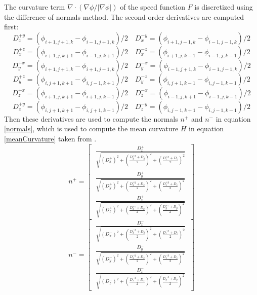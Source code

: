 The curvature term \(\nabla \cdot (\nabla \phi / |\nabla \phi|)\) of the speed function \(F\) is discretized using the difference of normals method. The second order derivatives are computed first:
\begin{equation*}
D_x^{+y} = (\phi_{i+1,j+1,k} - \phi_{i-1,j+1,k})/2 \quad D_x^{-y} = (\phi_{i+1,j-1,k} - \phi_{i-1,j-1,k})/2 
\end{equation*}
\begin{equation*}
D_x^{+z} = (\phi_{i+1,j,k+1} - \phi_{i-1,j,k+1})/2 \quad D_x^{-z} = (\phi_{i+1,j,k-1} - \phi_{i-1,j,k-1})/2 
\end{equation*}
\begin{equation*}
D_y^{+x} = (\phi_{i+1,j+1,k} - \phi_{i+1,j-1,k})/2 \quad D_y^{-x} = (\phi_{i-1,j+1,k} - \phi_{i-1,j-1,k})/2 
\end{equation*}
\begin{equation*}
D_y^{+z} = (\phi_{i,j+1,k+1} - \phi_{i,j-1,k+1})/2 \quad D_y^{-z} = (\phi_{i,j+1,k-1} - \phi_{i,j-1,k-1})/2 
\end{equation*}
\begin{equation*}
D_z^{+x} = (\phi_{i+1,j,k+1} - \phi_{i+1,j,k-1})/2 \quad D_z^{-x} = (\phi_{i-1,j,k+1} - \phi_{i-1,j,k-1})/2 
\end{equation*}
\begin{equation*}
D_z^{+y} = (\phi_{i,j+1,k+1} - \phi_{i,j+1,k-1})/2 \quad D_z^{-y} = (\phi_{i,j-1,k+1} - \phi_{i,j-1,k-1})/2 
\end{equation*}
\begin{equation}
\quad %
\end{equation}
Then these derivatives are used to compute the normals \(n^+\) and \(n^-\) in equation \ref{normals}, which is used to compute the mean curvature \(H\) in equation \ref{meanCurvature} taken from \cite{lefohn04}.
\begin{equation*}
n^+ = \begin{bmatrix}
\: \frac{D_x^+}{\sqrt{(D_x^+)^2 + (\frac{D_y^{+x}+D_y}{2})^2 + (\frac{D_z^{+x}+D_z}{2})^2}} \: \\[2.5em]
\: \frac{D_y^+}{\sqrt{(D_y^+)^2 + (\frac{D_x^{+y}+D_x}{2})^2 + (\frac{D_z^{+y}+D_z}{2})^2}} \: \\[2.5em]
\: \frac{D_z^+}{\sqrt{(D_z^+)^2 + (\frac{D_x^{+z}+D_x}{2})^2 + (\frac{D_y^{+z}+D_y}{2})^2}} \:
\end{bmatrix} 
\end{equation*}
\begin{equation}
n^- = \begin{bmatrix}
\: \frac{D_x^-}{\sqrt{(D_x^-)^2 + (\frac{D_y^{-x}+D_y}{2})^2 + (\frac{D_z^{-x}+D_z}{2})^2}} \: \\[2.5em]
\: \frac{D_y^-}{\sqrt{(D_y^-)^2 + (\frac{D_x^{-y}+D_x}{2})^2 + (\frac{D_z^{-y}+D_z}{2})^2}} \: \\[2.5em]
\: \frac{D_z^-}{\sqrt{(D_z^-)^2 + (\frac{D_x^{-z}+D_x}{2})^2 + (\frac{D_y^{-z}+D_y}{2})^2}} \:
\end{bmatrix} 
\label{normals}
\end{equation}

